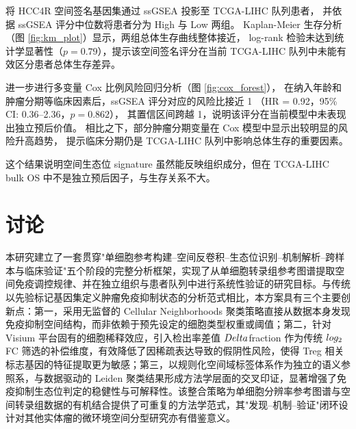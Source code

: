 \documentclass[12pt, a4paper]{ctexart}
\begin{document}
将 HCC4R 空间签名基因集通过 ssGSEA 投影至 TCGA-LIHC 队列患者，
并依据 ssGSEA 评分中位数将患者分为 High 与 Low 两组。
Kaplan-Meier 生存分析（图 \ref{fig:km_plot}）显示，两组总体生存曲线整体接近，
log-rank 检验未达到统计学显著性（$p = 0.79$），提示该空间签名评分在当前 TCGA-LIHC 队列中未能有效区分患者总体生存差异。

进一步进行多变量 Cox 比例风险回归分析（图 \ref{fig:cox_forest}），
在纳入年龄和肿瘤分期等临床因素后，ssGSEA 评分对应的风险比接近 1
（HR = 0.92，95\% CI: 0.36--2.36，$p = 0.862$），
其置信区间跨越 1，说明该评分在当前模型中未表现出独立预后价值。
相比之下，部分肿瘤分期变量在 Cox 模型中显示出较明显的风险升高趋势，
提示临床分期仍是 TCGA-LIHC 队列中影响总体生存的重要因素。

这个结果说明空间生态位 signature 虽然能反映组织成分，但在 TCGA-LIHC bulk OS 中不是独立预后因子，与生存关系不大。

\section{讨论}

本研究建立了一套贯穿"单细胞参考构建--空间反卷积--生态位识别--机制解析--跨样本与临床验证"五个阶段的完整分析框架，实现了从单细胞转录组参考图谱提取空间免疫调控规律、并在独立组织与患者队列中进行系统性验证的研究目标。与传统以先验标记基因集定义肿瘤免疫抑制状态的分析范式相比，本方案具有三个主要创新点：第一，采用无监督的 Cellular Neighborhoods 聚类策略直接从数据本身发现免疫抑制空间结构，而非依赖于预先设定的细胞类型权重或阈值；第二，针对 Visium 平台固有的细胞稀释效应，引入检出率差值 $\\Delta$fraction 作为传统 $\\log_2$FC 筛选的补偿维度，有效降低了因稀疏表达导致的假阴性风险，使得 Treg 相关标志基因的特征提取更为敏感；第三，以规则化空间域标签体系作为独立的语义参照系，与数据驱动的 Leiden 聚类结果形成方法学层面的交叉印证，显著增强了免疫抑制生态位判定的稳健性与可解释性。该整合策略为单细胞分辨率参考图谱与空间转录组数据的有机结合提供了可重复的方法学范式，其"发现--机制--验证"闭环设计对其他实体瘤的微环境空间分型研究亦有借鉴意义。

\vspace{0.4cm}
\end{document}
